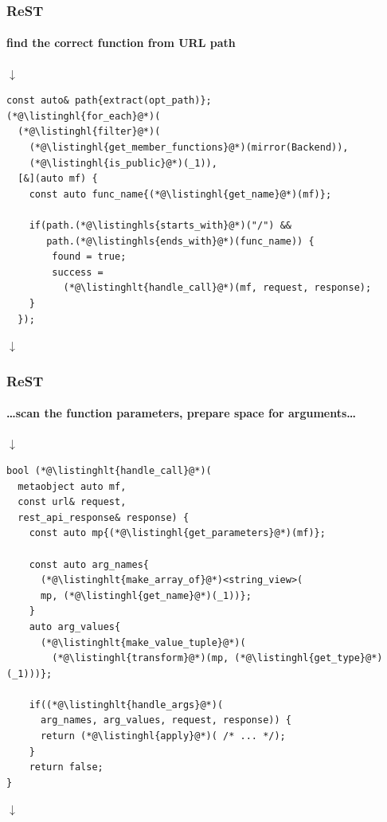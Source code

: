\documentclass[compress,table,xcolor=table]{beamer}
\begin{document}
\begin{frame}[fragile]
  \frametitle{ReST}
  \framesubtitle{find the correct function from URL path}
  \smaller
  \centering $\downarrow$
  \begin{lstlisting}[language=c++2x,basicstyle=\footnotesize\ttfamily]
const auto& path{extract(opt_path)};
(*@\listinghl{for_each}@*)(
  (*@\listinghl{filter}@*)(
    (*@\listinghl{get_member_functions}@*)(mirror(Backend)),
    (*@\listinghl{is_public}@*)(_1)),
  [&](auto mf) {
    const auto func_name{(*@\listinghl{get_name}@*)(mf)};

    if(path.(*@\listinghls{starts_with}@*)("/") &&
       path.(*@\listinghls{ends_with}@*)(func_name)) {
        found = true;
        success =
          (*@\listinghlt{handle_call}@*)(mf, request, response);
    }
  });
  \end{lstlisting}
  \centering $\downarrow$
  \vfill
\end{frame}
\begin{frame}[fragile]
  \frametitle{ReST}
  \framesubtitle{\ldots scan the function parameters, prepare space for arguments\ldots}
  \smaller
  \centering $\downarrow$
  \begin{lstlisting}[language=c++2x,basicstyle=\scriptsize\ttfamily]
bool (*@\listinghlt{handle_call}@*)(
  metaobject auto mf,
  const url& request,
  rest_api_response& response) {
    const auto mp{(*@\listinghl{get_parameters}@*)(mf)};

    const auto arg_names{
      (*@\listinghlt{make_array_of}@*)<string_view>(
      mp, (*@\listinghl{get_name}@*)(_1))};
    }
    auto arg_values{
      (*@\listinghlt{make_value_tuple}@*)(
        (*@\listinghl{transform}@*)(mp, (*@\listinghl{get_type}@*)(_1)))};

    if((*@\listinghlt{handle_args}@*)(
      arg_names, arg_values, request, response)) {
      return (*@\listinghl{apply}@*)( /* ... */);
    }
    return false;
}
  \end{lstlisting}
  \centering $\downarrow$
  \vfill
\end{frame}
\end{document}
